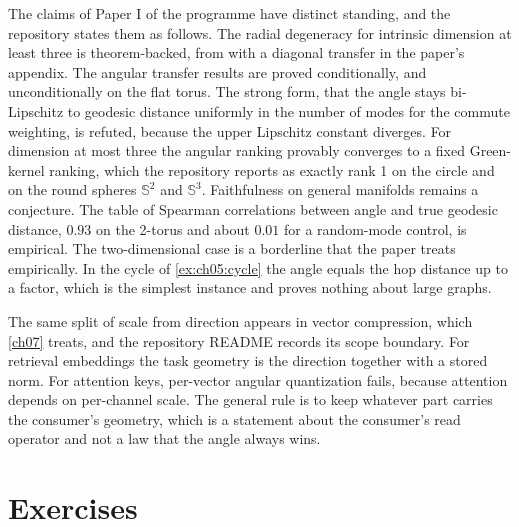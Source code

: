 The claims of Paper I of the programme have distinct standing, and the repository states them as follows. The radial degeneracy for intrinsic dimension at least three is theorem-backed, from \cite{vonluxburg2014} with a diagonal transfer in the paper's appendix. The angular transfer results are proved conditionally, and unconditionally on the flat torus. The strong form, that the angle stays bi-Lipschitz to geodesic distance uniformly in the number of modes for the commute weighting, is refuted, because the upper Lipschitz constant diverges. For dimension at most three the angular ranking provably converges to a fixed Green-kernel ranking, which the repository reports as exactly rank 1 on the circle and on the round spheres $\mathbb S^2$ and $\mathbb S^3$. Faithfulness on general manifolds remains a conjecture. The table of Spearman correlations between angle and true geodesic distance, $0.93$ on the 2-torus and about $0.01$ for a random-mode control, is empirical. The two-dimensional case is a borderline that the paper treats empirically. In the cycle of \cref{ex:ch05:cycle} the angle equals the hop distance up to a factor, which is the simplest instance and proves nothing about large graphs.

The same split of scale from direction appears in vector compression, which \cref{ch07} treats, and the repository README records its scope boundary. For retrieval embeddings the task geometry is the direction together with a stored norm. For attention keys, per-vector angular quantization fails, because attention depends on per-channel scale. The general rule is to keep whatever part carries the consumer's geometry, which is a statement about the consumer's read operator and not a law that the angle always wins.



\section*{Exercises}

